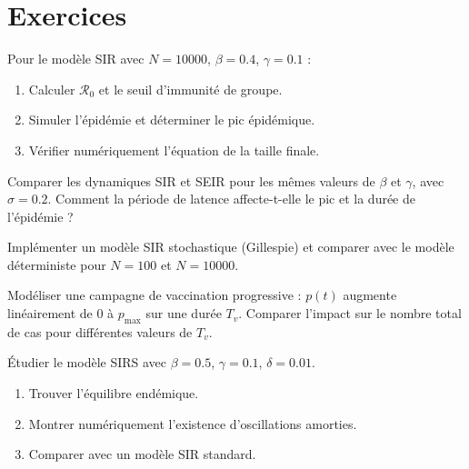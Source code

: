 \section{Exercices}

\begin{exercice}
Pour le mod\`ele SIR avec $N=10000$, $\beta=0.4$, $\gamma=0.1$ :
\begin{enumerate}
  \item Calculer $\mathcal{R}_0$ et le seuil d'immunit\'e de groupe.
  \item Simuler l'\'epid\'emie et d\'eterminer le pic \'epid\'emique.
  \item V\'erifier num\'eriquement l'\'equation de la taille finale.
\end{enumerate}
\end{exercice}

\begin{exercice}
Comparer les dynamiques SIR et SEIR pour les m\^emes valeurs de
$\beta$ et $\gamma$, avec $\sigma=0.2$.  Comment la p\'eriode de
latence affecte-t-elle le pic et la dur\'ee de l'\'epid\'emie ?
\end{exercice}

\begin{exercice}
Impl\'ementer un mod\`ele SIR stochastique (Gillespie) et comparer
avec le mod\`ele d\'eterministe pour $N=100$ et $N=10000$.
\end{exercice}

\begin{exercice}
Mod\'eliser une campagne de vaccination progressive : $p(t)$
augmente lin\'eairement de 0 \`a $p_{\max}$ sur une dur\'ee $T_v$.
Comparer l'impact sur le nombre total de cas pour diff\'erentes
valeurs de $T_v$.
\end{exercice}

\begin{exercice}
\'Etudier le mod\`ele SIRS avec $\beta=0.5$, $\gamma=0.1$, $\delta=0.01$.
\begin{enumerate}
  \item Trouver l'\'equilibre end\'emique.
  \item Montrer num\'eriquement l'existence d'oscillations amorties.
  \item Comparer avec un mod\`ele SIR standard.
\end{enumerate}
\end{exercice}
